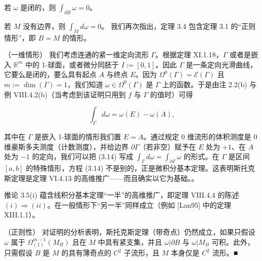 \begin{corollary}

\begin{subitems}
\item

若 $ \omega $ 是闭的，则 $ \int_{\partial B}\omega = 0 $。

\item

若 $ M $ 没有边界，则 $ \int_M d\omega = 0 $。
我们再次指出，定理 3.4 包含定理 3.1 的“正则情形”，即 $ B = M $ 的情形。

\end{subitems}

\end{corollary}

\begin{remark}

\begin{items}
\item

（一维情形） 我们考虑连通的紧一维定向流形 $ \Gamma $。根据定理 XI.1.18，$ \Gamma $ 或者是嵌入 $ \mathbb{R}^m $ 中的 1-球面，或者微分同胚于 $ I := [0,1] $。因此 $ \Gamma $ 是一条定向光滑曲线，它要么是闭的，要么具有起点 $ A $ 与终点 $ E $。因为 $ \Omega^0(\Gamma) = \mathcal{E}(\Gamma) $ 且 $ m := \dim(\Gamma) = 1 $，我们知道 $ \omega \in \Omega^0(\Gamma) $ 是 $ \Gamma $ 上的函数。于是由注 2.2(b) 与例 VIII.4.2(b)（当考虑到该证明只用到 $ f $ 与 $ \Gamma $ 的值时）可得

\begin{equation}
\int_{\Gamma} d\omega = \omega(E) - \omega(A) ,\tag{3.14}
\end{equation}

其中在 $ \Gamma $ 是嵌入 1-球面的情形我们置 $ E = A $。通过规定 0 维流形的体积测度是 0 维豪斯多夫测度（计数测度），并给边界 $ \partial\Gamma $（若非空）赋予在 $ E $ 处为 $ +1 $、在 $ A $ 处为 $ -1 $ 的定向，我们可以把 (3.14) 写成 $ \int_{\Gamma} d\omega = \int_{\partial\Gamma}\omega $ 的形式。在 $ \Gamma $ 是区间 $ [a,b] $ 的特殊情形，方程 (3.14) 不是别的，正是微积分基本定理。这表明斯托克斯定理是定理 VI.4.13 的高维推广——而且确实以它为基础。。

\item

推论 3.5(i) 蕴含线积分基本定理“一半”的高维推广，即定理 VIII.4.4 的陈述 $ (i)\Rightarrow(ii) $。在一般情形下“另一半”同样成立（例如 [Lan95] 中的定理 XIII.1.1）。

\item

（正则性） 对证明的分析表明，斯托克斯定理（带奇点）仍然成立，如果只假设 $ \omega $ 属于 $ \Omega^{m-1}_{(1)}(M_B) $ 且在 $ M $ 中具有紧支集，并且 $ \omega|\partial B $ 与 $ \omega|M_B $ 可积。此外，只需假设 $ B $ 是 $ M $ 的具有薄奇点的 $ C^2 $ 子流形，且 $ M $ 本身仅是 $ C^2 $ 流形。\nobreak\hspace{0.35em}■

\end{items}

\end{remark}

